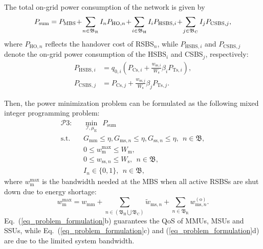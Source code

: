 \documentclass[12pt, draftclsnofoot,onecolumn]{IEEEtran}
\begin{document}
The total on-grid power consumption of the network is given by
\begin{equation}\label{eq_P_all_BS} \small
    P_{\mathrm{sum}} = P_\mathrm{MBS} \!+\! \sum\limits_{n\in \mathfrak{B}_\mathrm{R}} I_n P_{\mathrm{HO},n} \!+\! \sum\limits_{i\in \mathfrak{B}_\mathrm{H}} I_i P_{\mathrm{HSBS},i} \!+\! \sum\limits_{j\in \mathfrak{B}_\mathrm{C}} I_j P_{\mathrm{CSBS},j},
\end{equation}
where $P_{\mathrm{HO},n}$ reflects the handover cost of RSBS$_n$, while $P_{\mathrm{HSBS},i}$ and $P_{\mathrm{CSBS},j}$ denote the on-grid power consumption of the HSBS$_i$ and CSBS$_j$, respectively:
\begin{equation}\label{eq_P_HSBS_CSBS}
    \begin{split}
    P_{\mathrm{HSBS},i} & = q_{0,i} \left(P_{\mathrm{Cs},i} + \frac{w_{\mathrm{ss},i}}{W_\mathrm{s}} \beta_i P_{\mathrm{Ts},i}\right),\\
    P_{\mathrm{CSBS},j} & = P_{\mathrm{Cs},j} + \frac{w_{\mathrm{ss},j}}{W_\mathrm{s}} \beta_j P_{\mathrm{Ts},j}.
    \end{split}
\end{equation}

Then, the power minimization problem can be formulated as the following mixed integer programming problem:
\begin{subequations}\label{eq_problem_formulation}
    \begin{align}
       \mathcal{P}3:~~~&\min\limits_{\mathcal{I},\mu_\mathrm{E}}~~ P_\mathrm{sum} \\
       \mathrm{s.t.} ~~~& G_\mathrm{mm}\leq \eta , G_{\mathrm{ms},n}\leq \eta , G_{\mathrm{ss},n}\leq \eta ,~~n\in \mathfrak{B},\\
       & 0 \leq w_\mathrm{m}^{\max} \leq W_\mathrm{m},\\
       & 0\leq w_{\mathrm{ss},n}\leq W_\mathrm{s}, ~~ n\in \mathfrak{B}, \\
       & I_n \in \{0,1\},~~ n\in \mathfrak{B},
    \end{align}
\end{subequations}
where $w_\mathrm{m}^{\max}$ is the bandwidth needed at the MBS when all active RSBSs are shut down due to energy shortage:
\begin{equation}\label{eq_w_m_max}
    w_\mathrm{m}^{\max} = w_\mathrm{mm} + \sum\limits_{n\in (\mathfrak{B}_\mathrm{H}\bigcup \mathfrak{B}_\mathrm{C})} \tilde{w}_{\mathrm{ms},n} +  \sum\limits_{n\in\mathfrak{B}_\mathrm{R}} w_{\mathrm{ms},n}^{(\mathrm{o})}.
\end{equation}
Eq.~(\ref{eq_problem_formulation}b) guarantees the QoS of MMUs, MSUs and SSUs, while Eq.~(\ref{eq_problem_formulation}c) and (\ref{eq_problem_formulation}d) are due to the limited system bandwidth.
\end{document}
